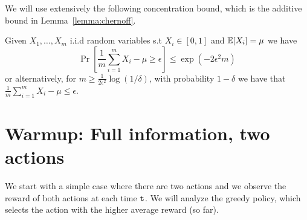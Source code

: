 

We will use extensively the following concentration bound, which is the additive bound in Lemma~\ref{lemma:chernoff}.

\begin{lemma}
\label{lem:hoeffding}
%
Given $X_{1},\dots,X_{m}$ i.i.d random
variables s.t $X_{i}\in[0,1]$ and $\mathbb{E}[X_{i}]=\mu$ we have
\[
\Pr\left[\frac{1}{m} \sum_{i=1}^{m}X_{i}-\mu \ge\epsilon\right] \le  \exp(-2\epsilon^{2}m)
\]
or alternatively, for $m\geq \frac{1}{2\epsilon^2}\log(1/\delta)$, with probability $1-\delta$ we have that $\frac{1}{m} \sum_{i=1}^{m}X_{i}-\mu \le\epsilon$.
\end{lemma}


\section{Warmup: Full information, two actions }

We start with a simple case where there are two actions and we
observe the reward of both actions at each time ${\tt t}$. We will analyze
the greedy policy, which selects the action with the higher average
reward (so far).

